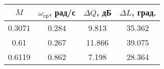 \begin{tabular}{|c|c|c|c|}
\hline
   $M$ &  $\omega_{ср}$, рад/с &  $\Delta Q$, дБ &  $\Delta L$, град. \\
\hline
0.3071 &                 0.284 &           9.813 &             35.362 \\
  0.61 &                 0.267 &          11.866 &             39.075 \\
0.6119 &                 0.862 &           7.198 &             28.364 \\
\hline
\end{tabular}
